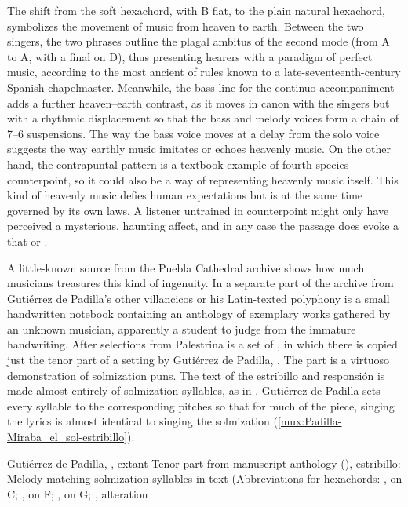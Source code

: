 The shift from the  soft hexachord, with B flat, to the plain
natural hexachord, symbolizes the movement of music from heaven to earth.
Between the two singers, the two phrases outline the plagal ambitus of the
second mode (from A to A, with a final on D), thus presenting hearers with a
paradigm of perfect music, according to the most ancient of rules known to a
late-seventeenth-century Spanish chapelmaster.
Meanwhile, the bass line for the continuo accompaniment adds a further
heaven--earth contrast, as it moves in canon with the singers but with a
rhythmic displacement so that the bass and melody voices form a chain of 7--6
suspensions.
The way the bass voice moves at a delay from the solo voice suggests the way
earthly music imitates or echoes heavenly music.
On the other hand, the contrapuntal pattern is a textbook example of
fourth-species counterpoint, so it could also be a way of representing heavenly
music itself.  
This kind of heavenly music defies human expectations but is at the same time
governed by its own laws.
A listener untrained in counterpoint might only have perceived a mysterious,
haunting affect, and in any case the passage does evoke a  that  or .

A little-known source from the Puebla Cathedral archive shows how much
musicians treasures this kind of ingenuity.
In a separate part of the archive from Gutiérrez de Padilla's other villancicos
or his Latin-texted polyphony is a small handwritten notebook containing an
anthology of exemplary works gathered by an unknown musician, apparently a
student to judge from the immature handwriting.
After selections from Palestrina is a set of , in which there is copied just the tenor part of a setting by
Gutiérrez de Padilla, .
The part is a virtuoso demonstration of solmization puns.
The text of the estribillo and responsión is made almost entirely of
solmization syllables, as in .
Gutiérrez de Padilla sets every syllable to the corresponding pitches so that
for much of the piece, singing the lyrics is almost identical to singing the
solmization (\cref{mux:Padilla-Miraba_el_sol-estribillo}).

{Gutiérrez de Padilla, , extant Tenor part from
manuscript anthology (), estribillo: Melody matching
solmization syllables in text (Abbreviations for hexachords: ,
 on C; ,  on F; , 
on G; ,  alteration}

